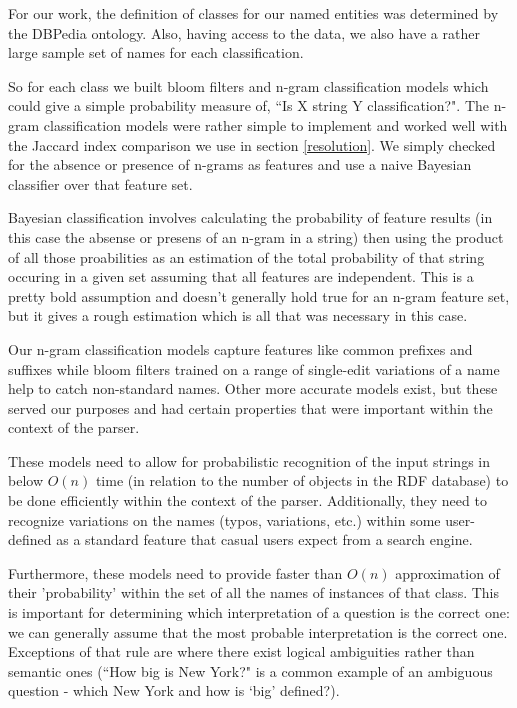 \documentclass[11pt]{article}
\begin{document}
For our work, the definition of classes for our named entities was determined by the
DBPedia ontology. Also, having access to the data, we also have a rather large sample
set of names for each classification.

So for each class we built bloom filters\cite{bloom} and n-gram classification models 
which could give a simple probability measure of, ``Is X string Y classification?". 
The n-gram classification models were rather simple to implement and worked well 
with the Jaccard index comparison we use in section \ref{resolution}. We simply
checked for the absence or presence of n-grams as features and use a naive
Bayesian classifier over that feature set\cite{bayes}.

Bayesian classification involves calculating the probability of feature results
(in this case the absense or presens of an n-gram in a string) then using the product
of all those proabilities as an estimation of the total probability of that string
occuring in a given set assuming that all features are independent. This is a
pretty bold assumption and doesn't generally hold true for an n-gram feature set,
but it gives a rough estimation which is all that was necessary in this case.

Our n-gram classification models capture features like common prefixes and suffixes
while bloom filters trained on a range of single-edit variations of a name help
to catch non-standard names. Other more accurate models exist, but these served
our purposes and had certain properties that were important within the context
of the parser.

These models need to allow for probabilistic recognition of the input strings in 
below $O(n)$ time (in relation to the number of objects in the RDF
database) to be done efficiently within the context of the parser. 
Additionally, they need to recognize variations on
the names (typos, variations, etc.) within some user-defined as a standard feature
that casual users expect from a search engine.

Furthermore, these models need to provide faster than $O(n)$
approximation of their 'probability' within the set of all the names of instances
of that class. This is important for determining which interpretation of a
question is the correct one: we can generally assume that the most probable
interpretation is the correct one. Exceptions of that rule are where there exist
logical ambiguities rather than semantic ones (``How big is New York?" is a common example
of an ambiguous question - which New York and how is `big' defined?). 
\end{document}
